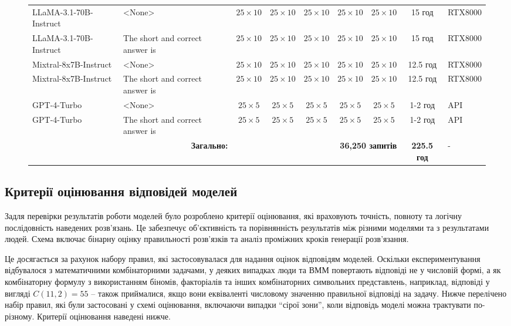 \begin{figure}[!ht]
{\begin{tabular}{|l|l|c|c|c|c|c|c|l|}
    LLaMA-3.1-70B-Instruct & <None> & $25 \times 10$ & $25 \times 10$ & $25 \times 10$ & $25 \times 10$ & $25 \times 10$ & 15 год & RTX8000 \\
    LLaMA-3.1-70B-Instruct & The short and correct answer is & $25 \times 10$ & $25 \times 10$ & $25 \times 10$ & $25 \times 10$ & $25 \times 10$ & 15 год & RTX8000 \\
    \hline
    Mixtral-8x7B-Instruct & <None> & $25 \times 10$ & $25 \times 10$ & $25 \times 10$ & $25 \times 10$ & $25 \times 10$ & 12.5 год & RTX8000 \\
    Mixtral-8x7B-Instruct & The short and correct answer is & $25 \times 10$ & $25 \times 10$ & $25 \times 10$ & $25 \times 10$ & $25 \times 10$ & 12.5 год & RTX8000 \\
    \hline
    GPT-4-Turbo & <None> & $25 \times 5$ & $25 \times 5$ & $25 \times 5$ & $25 \times 5$ & $25 \times 5$ & 1-2 год & API \\
    GPT-4-Turbo & The short and correct answer is & $25 \times 5$ & $25 \times 5$ & $25 \times 5$ & $25 \times 5$ & $25 \times 5$ & 1-2 год & API \\
    \hline
    \hline
    
    \multicolumn{2}{|r|}{\textbf{Загально:}} & \multicolumn{5}{|r|}{\textbf{36,250 запитів}} & \textbf{225.5 год} & - \\
    \hline
    \end{tabular}%
    }
\end{figure}

\subsection{Критерії оцінювання відповідей моделей}

Задля перевірки результатів роботи моделей було розроблено критерії оцінювання, які враховують точність, повноту та логічну послідовність наведених розв'язань. Це забезпечує об'єктивність та порівнянність результатів між різними моделями та з результатами людей. Схема включає бінарну оцінку правильності розв'язків та аналіз проміжних кроків генерації розв'язання.

Це досягається за рахунок набору правил, які застосовувалася для надання оцінок відповідям моделей. Оскільки експериментування відбувалося з математичними комбінаторними задачами, у деяких випадках люди та ВММ повертають відповіді не у числовій формі, а як комбінаторну формулу з використанням біномів, факторіалів та інших комбінаторних символьних представлень, наприклад, відповіді у вигляді \(C(11, 2) = 55\) -- також приймалися, якщо вони еквіваленті числовому значенню правильної відповіді на задачу. Нижче перелічено набір правил, які були застосовані у схемі оцінювання, включаючи випадки ``сірої зони'', коли відповідь моделі можна трактувати по-різному. Критерії оцінювання наведені нижче.

